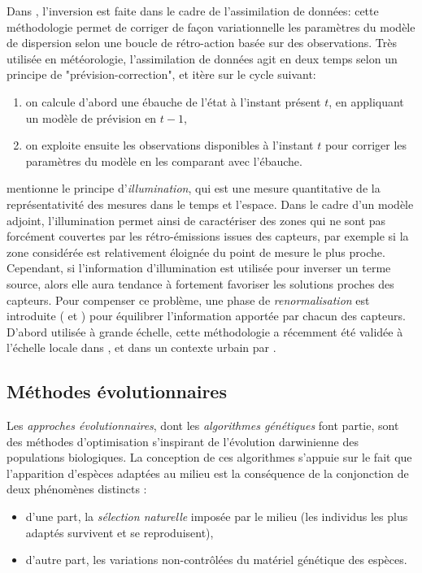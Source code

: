 	 Dans \cite{Robertson1998}, l'inversion est faite dans le cadre de l'assimilation de données: cette méthodologie permet de corriger de façon variationnelle les paramètres du modèle de dispersion selon une boucle de rétro-action basée sur des observations. Très utilisée en météorologie, l'assimilation de données agit en deux temps selon un principe de "prévision-correction", et itère sur le cycle suivant:
	\begin{enumerate}
		\item  on calcule d'abord une ébauche de l'état à l'instant présent $t$, en appliquant un modèle de prévision en $t-1$,
		\item  on exploite ensuite les observations disponibles à l'instant $t$ pour corriger les paramètres du modèle en les comparant avec l'ébauche. \\
	\end{enumerate}
	
	\cite{Issartel2005} mentionne le principe d'\textit{illumination}, qui est une mesure quantitative de la représentativité des mesures dans le temps et l'espace. Dans le cadre d'un modèle adjoint, l'illumination permet ainsi de caractériser des zones qui ne sont pas forcément couvertes par les rétro-émissions issues des capteurs, par exemple si la zone considérée est relativement éloignée du point de mesure le plus proche. Cependant, si l'information d'illumination est utilisée pour inverser un terme source, alors elle aura tendance à fortement favoriser les solutions proches des capteurs. Pour compenser ce problème, une phase de \textit{renormalisation} est introduite (\cite{Issartel2007} et \cite{Sharan2009}) pour équilibrer l'information apportée par chacun des capteurs. D'abord utilisée à grande échelle, cette méthodologie a récemment été validée à l'échelle locale dans \cite{Singh2014}, et dans un contexte urbain par \cite{Kumar2015}.
	
	
	
	


 \subsection{Méthodes évolutionnaires}
 
 Les \textit{approches évolutionnaires}, dont les \textit{algorithmes génétiques} font partie, sont des méthodes d'optimisation s'inspirant de l'évolution darwinienne des populations biologiques. La conception de ces algorithmes s'appuie sur le fait que l'apparition d'espèces adaptées au milieu est la conséquence de la conjonction de deux phénomènes distincts : 
 \begin{itemize}
 	\item d'une part, la \textit{sélection naturelle} imposée par le milieu (les individus les plus adaptés survivent et se reproduisent),
 	\item d'autre part, les variations non-contrôlées du matériel génétique des espèces.
 \end{itemize}
 
